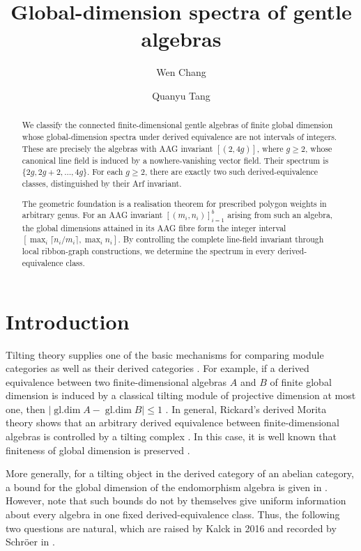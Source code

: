 \documentclass[11pt]{amsart}
\title[Global-dimension spectra of gentle algebras]
{Global-dimension spectra of gentle algebras}
\author{Wen Chang}
\author{Quanyu Tang}
\date{}
\theoremstyle{definition}
\theoremstyle{plain}
\theoremstyle{definition}
\theoremstyle{definition}
\newcommand{\gldim}{\operatorname{gl.dim}}
\begin{document}
\begin{abstract}
We classify the connected finite-dimensional gentle algebras
of finite global dimension whose global-dimension spectra under
derived equivalence are not intervals of integers.
These are precisely the algebras with AAG invariant $[(2,4g)]$,
where $g\geq2$, whose canonical line field is induced by a
nowhere-vanishing vector field.
Their spectrum is $\{2g,2g+2,\ldots,4g\}$.
For each $g\geq2$, there are exactly two such derived-equivalence
classes, distinguished by their Arf invariant.

The geometric foundation is a realisation theorem for prescribed
polygon weights in arbitrary genus.
For an AAG invariant $[(m_i,n_i)]_{i=1}^b$ arising from such an
algebra, the global dimensions attained in its AAG fibre form
the integer interval
$[\max_i\lceil n_i/m_i\rceil,\max_i n_i]$.
By controlling the complete line-field invariant through local
ribbon-graph constructions, we determine the spectrum in every
derived-equivalence class.
\end{abstract}

\maketitle

\tableofcontents
\section{Introduction}
\label{sec:introduction}

Tilting theory supplies one of the basic mechanisms for comparing
module categories as well as their derived categories
\cite{HappelRingel,Happel1987}.
For example, if a derived equivalence between two finite-dimensional algebras
$A$ and $B$ of finite global dimension is induced by a classical
tilting module of projective dimension at most one, then
$|\gldim A-\gldim B|\leq1$
\cite[Proposition~III.3.4]{Happel1988}. In general, Rickard's derived Morita theory
shows that an arbitrary derived equivalence between finite-dimensional
algebras is controlled by a tilting complex \cite{Rickard}. In this case, it is well known that finiteness of global dimension is preserved \cite[12.5]{GabrielRoiter}.  

More generally, for a tilting object in the derived category of an abelian category, a bound for the global dimension of the endomorphism algebra is given in \cite{KellerKrause}. However, note that such bounds do
not by themselves give uniform information about every algebra in one fixed
derived-equivalence class.
Thus, the following two questions are natural, which are raised by Kalck in 2016
and recorded by Schr\"oer in \cite[Questions~13.40 and~13.41]{SchroerAtlas}.
\end{document}
